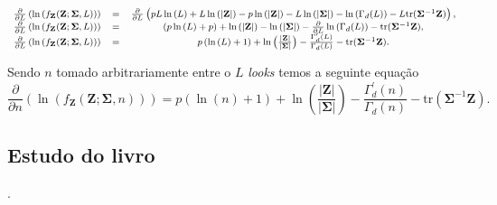 \begin{equation}\label{eqn116}
	{\footnotesize
\begin{array}{ccc}
	\frac{\partial}{\partial L}\left(\ln{\left(f_{\mathbf{Z}}(\mathbf{Z};\mathbf{\Sigma},L)\right)}\right)&=&\frac{\partial}{\partial L}\left(pL\ln{\left(L\right)}+L\ln{\left( |\mathbf{Z}|\right)}-p\ln{\left( |\mathbf{Z}|\right)} - L \ln{\left(|\mathbf{\Sigma}|\right)}-\ln{\left(\Gamma_d(L)\right)}-L\mathrm{tr}{(\mathbf{\Sigma}^{-1}\mathbf{Z})}\right), \\
	\frac{\partial}{\partial L}\left(\ln{\left(f_{\mathbf{Z}}(\mathbf{Z};\mathbf{\Sigma},L)\right)}\right)&=&\left(p\ln{\left(L\right)}+p\right)+\ln{\left( |\mathbf{Z}|\right)} - \ln{\left(|\mathbf{\Sigma}|\right)}-\frac{\partial}{\partial L}\ln{\left(\Gamma_d(L)\right)}-\mathrm{tr}{(\mathbf{\Sigma}^{-1}\mathbf{Z})}, \\
	\frac{\partial}{\partial L}\left(\ln{\left(f_{\mathbf{Z}}(\mathbf{Z};\mathbf{\Sigma},L)\right)}\right)&=&p\left(\ln{\left(L\right)}+1\right)+\ln{\left(\frac{|\mathbf{Z}|}{|\mathbf{\Sigma|}}\right)}-\frac{\Gamma^{\prime}_d(L)}{\Gamma_d(L)}-\mathrm{tr}{(\mathbf{\Sigma}^{-1}\mathbf{Z})}. \\
\end{array}}
\end{equation}

Sendo $n$ tomado arbitrariamente entre o $L$ {\it looks} temos a seguinte equação
\begin{equation}\label{eqn117}
	\frac{\partial}{\partial n}\left(\ln{\left(f_{\mathbf{Z}}(\mathbf{Z};\mathbf{\Sigma},n)\right)}\right)=p\left(\ln{\left(n\right)}+1\right)+\ln{\left(\frac{|\mathbf{Z}|}{|\mathbf{\Sigma|}}\right)}-\frac{\Gamma^{\prime}_d(n)}{\Gamma_d(n)}-\mathrm{tr}{(\mathbf{\Sigma}^{-1}\mathbf{Z})}. 
\end{equation}


\subsection{Estudo do livro  \cite{lp}}.

